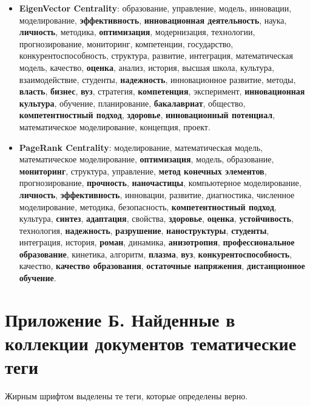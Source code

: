 \begin{itemize}
    \item \textbf{EigenVector Centrality}: образование, управление, модель, инновации, моделирование, \textbf{эффективность}, \textbf{инновационная деятельность}, наука, \textbf{личность}, методика, \textbf{оптимизация}, модернизация, технологии, прогнозирование, мониторинг, компетенции, государство, конкурентоспособность, структура, развитие, интеграция, математическая модель, качество, \textbf{оценка}, анализ, история, высшая школа, культура, взаимодействие, студенты, \textbf{надежность}, инновационное развитие, методы, \textbf{власть}, \textbf{бизнес}, \textbf{вуз}, стратегия, \textbf{компетенция}, эксперимент, \textbf{инновационная культура}, обучение, планирование, \textbf{бакалавриат}, общество, \textbf{компетентностный подход}, \textbf{здоровье}, \textbf{инновационный потенциал}, математическое моделирование, концепция, проект.
    \item \textbf{PageRank Centrality}: моделирование, математическая модель, математическое моделирование, \textbf{оптимизация}, модель, образование, \textbf{мониторинг}, структура, управление, \textbf{метод конечных элементов}, прогнозирование, \textbf{прочность}, \textbf{наночастицы}, компьютерное моделирование, \textbf{личность}, \textbf{эффективность}, инновации, развитие, диагностика, численное моделирование, методика, безопасность, \textbf{компетентностный подход}, культура, \textbf{синтез}, \textbf{адаптация}, свойства, \textbf{здоровье}, \textbf{оценка}, \textbf{устойчивость}, технология, \textbf{надежность}, \textbf{разрушение}, \textbf{наноструктуры}, \textbf{студенты}, интеграция, история, \textbf{роман}, динамика, \textbf{анизотропия}, \textbf{профессиональное образование}, кинетика, алгоритм, \textbf{плазма}, \textbf{вуз}, \textbf{конкурентоспособность}, качество, \textbf{качество образования}, \textbf{остаточные напряжения}, \textbf{дистанционное обучение}.
\end{itemize}

\chapter{Приложение Б. Найденные в коллекции документов тематические теги} \label{AppendixB}
Жирным шрифтом выделены те теги, которые определены верно.

